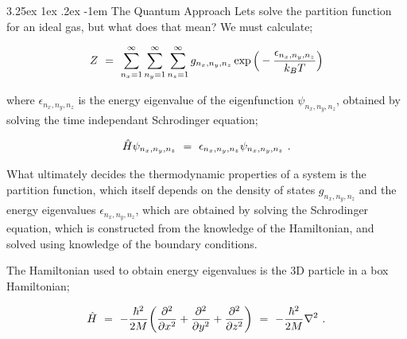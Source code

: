 \documentclass{article}
\makeatletter
\renewcommand\subparagraph{\@startsection{subparagraph}{6}{\parindent}%
  {3.25ex \@plus1ex \@minus .2ex}%
  {-1em}%
  {\normalfont\normalsize\bfseries}}
\makeatother
\begin{document}
\subparagraph{The Quantum Approach}
Lets solve the partition function for an ideal gas, but what does that mean? We must calculate;

\begin{equation} \label{eb-eq-256-71}
Z \hspace{0.125cm} = \hspace{0.125cm} \sum_{n_x = 1}^{\infty} \sum_{n_y = 1}^{\infty} \sum_{n_z = 1}^{\infty} g_{n_x, n_y, n_z} \exp{\Big(-\frac{\epsilon_{n_x, n_y, n_z}}{k_B T} \Big)}
\end{equation}

where \begin{math} \epsilon_{n_x, n_y, n_z} \end{math} is the energy eigenvalue of the eigenfunction \begin{math} \psi_{n_x, n_y, n_z} \end{math}, obtained by solving the time independant Schrodinger equation;

\begin{equation} \label{eb-eq-256-72}
\hat{H} \psi_{n_x, n_y, n_z} \hspace{0.125cm} = \hspace{0.125cm} \epsilon_{n_x, n_y, n_z} \psi_{n_x, n_y, n_z} \hspace{0.125cm} .
\end{equation}

What ultimately decides the thermodynamic properties of a system is the partition function, which itself depends on the density of states \begin{math} g_{n_x, n_y, n_z} \end{math} and the energy eigenvalues \begin{math} \epsilon_{n_x, n_y, n_z} \end{math}, which are obtained by solving the Schrodinger equation, which is constructed from the knowledge of the Hamiltonian, and solved using knowledge of the boundary conditions. 

The Hamiltonian used to obtain energy eigenvalues is the 3D particle in a box Hamiltonian;

\begin{equation} \label{eb-eq-256-73}
\hat{H} \hspace{0.125cm} = \hspace{0.125cm} - \frac{\hbar^2}{2 M} \bigg( \frac{\partial^2}{\partial{x^2}} + \frac{\partial^2}{\partial{y^2}} + \frac{\partial^2}{\partial{z^2}} \bigg) \hspace{0.125cm} = \hspace{0.125cm} - \frac{\hbar^2}{2 M} \nabla^2 \hspace{0.125cm} .
\end{equation}
\end{document}
